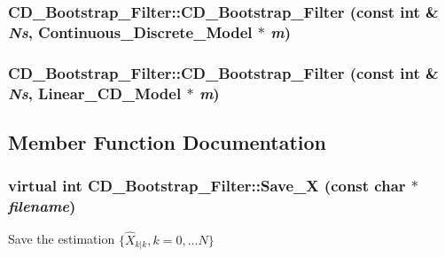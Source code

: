 \hypertarget{class_c_d___bootstrap___filter_bff15b578b01eb0b7cb4d71f044123a2}{
\subsubsection[{CD\_\-Bootstrap\_\-Filter}]{\setlength{\rightskip}{0pt plus 5cm}CD\_\-Bootstrap\_\-Filter::CD\_\-Bootstrap\_\-Filter (const int \& {\em Ns}, \/  {\bf Continuous\_\-Discrete\_\-Model} $\ast$ {\em m})}}
\label{class_c_d___bootstrap___filter_bff15b578b01eb0b7cb4d71f044123a2}


\hypertarget{class_c_d___bootstrap___filter_2b404414afe25a0a62abf45d22e34a8c}{
\subsubsection[{CD\_\-Bootstrap\_\-Filter}]{\setlength{\rightskip}{0pt plus 5cm}CD\_\-Bootstrap\_\-Filter::CD\_\-Bootstrap\_\-Filter (const int \& {\em Ns}, \/  {\bf Linear\_\-CD\_\-Model} $\ast$ {\em m})}}
\label{class_c_d___bootstrap___filter_2b404414afe25a0a62abf45d22e34a8c}




\subsection{Member Function Documentation}
\hypertarget{class_c_d___bootstrap___filter_eb203b8cdeb51133a232dce5763ed153}{
\subsubsection[{Save\_\-X}]{\setlength{\rightskip}{0pt plus 5cm}virtual int CD\_\-Bootstrap\_\-Filter::Save\_\-X (const char $\ast$ {\em filename})}}
\label{class_c_d___bootstrap___filter_eb203b8cdeb51133a232dce5763ed153}


Save the estimation $ \{ \hat{X}_{k|k} ,k=0,...N \} $

